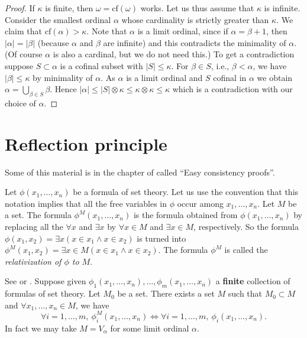 \begin{proof}
If $\kappa$ is finite, then $\omega = \text{cf}(\omega)$ works.
Let us thus assume that $\kappa$ is infinite.
Consider the smallest ordinal $\alpha$ whose cardinality is strictly greater
than $\kappa$. We claim that $\text{cf}(\alpha) > \kappa$.
Note that $\alpha$ is a limit ordinal, since if $\alpha = \beta + 1$, then
$|\alpha| = |\beta|$ (because $\alpha$ and $\beta$ are infinite) and
this contradicts the minimality of $\alpha$. (Of course $\alpha$ is also
a cardinal, but we do not need this.) To get a contradiction
suppose $S \subset \alpha$ is a cofinal
subset with $|S| \leq \kappa$. For $\beta \in S$, i.e., $\beta < \alpha$,
we have $|\beta| \leq \kappa$ by minimality of $\alpha$. As $\alpha$ is
a limit ordinal and $S$ cofinal in $\alpha$ we obtain
$\alpha = \bigcup_{\beta \in S} \beta$. Hence
$|\alpha| \leq |S| \otimes \kappa \leq \kappa \otimes \kappa \leq \kappa$
which is a contradiction with our choice of $\alpha$.
\end{proof}



\section{Reflection principle}
\label{section-reflection-principle}

\noindent
Some of this material is in the chapter of \cite{Kunen} called
``Easy consistency proofs''.

\medskip\noindent
Let $\phi(x_1, \ldots, x_n)$ be a formula of set theory.
Let us use the convention that this notation implies that
all the free variables in $\phi$ occur among $x_1, \ldots, x_n$.
Let $M$ be a set.
The formula $\phi^M(x_1, \ldots, x_n)$ is the
formula obtained from $\phi(x_1, \ldots, x_n)$ by replacing all the
$\forall x$ and $\exists x$ by $\forall x\in M$ and $\exists x\in M$,
respectively. So the formula
$\phi(x_1, x_2) = \exists x (x\in x_1 \wedge x\in x_2)$
is turned  into
$\phi^M(x_1, x_2) = \exists x \in M (x\in x_1 \wedge x\in x_2)$.
The formula $\phi^M$ is called the {\it relativization of $\phi$
to $M$}.

\begin{theorem}
\label{theorem-reflection-principle}
See \cite[Theorem 12.14]{Jech} or \cite[Theorem 7.4]{Kunen}.
Suppose given $\phi_1(x_1, \ldots, x_n), \ldots, \phi_m(x_1, \ldots, x_n)$
a {\bf finite} collection of
formulas of set theory. Let $M_0$ be a set.
There exists a set $M$ such that
$M_0 \subset M$ and
$\forall x_1, \ldots, x_n \in M$, we have
$$
\forall i = 1, \ldots, m, \ \phi_i^{M}(x_1, \ldots, x_n)
\Leftrightarrow
\forall i = 1, \ldots, m, \ \phi_i(x_1, \ldots, x_n).
$$
In fact we may take $M = V_\alpha$ for some limit ordinal $\alpha$.
\end{theorem}


